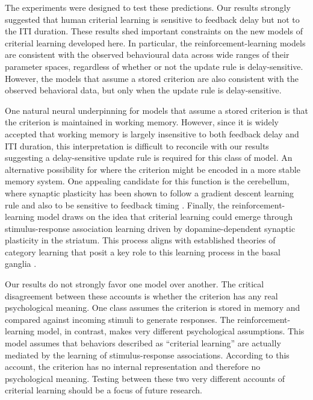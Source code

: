 \documentclass[doc, floatsintext]{apa7}
\begin{document}
The experiments were designed to test these predictions. Our
results strongly suggested that human criterial learning is
sensitive to feedback delay but not to the ITI duration.
These results shed important constraints on the new models
of criterial learning developed here. In particular, the
reinforcement-learning models are consistent with the
observed behavioural data across wide ranges of their
parameter spaces, regardless of whether or not the update
rule is delay-sensitive.  However, the models that assume a
stored criterion are also consistent with the observed
behavioral data, but only when the update rule is
delay-sensitive.

One natural neural underpinning for models that assume a
stored criterion is that the criterion is maintained in
working memory. However, since it is widely accepted that
working memory is largely insensitive to both feedback delay
and ITI duration, this interpretation is difficult to
reconcile with our results suggesting a delay-sensitive
update rule is required for this class of model. An
alternative possibility for where the criterion might be
encoded in a more stable memory system.  One appealing
candidate for this function is the cerebellum, where
synaptic plasticity has been shown to follow a gradient
descent learning rule and also to be sensitive to feedback
timing \parencite{brudner2016delayed, held_adaptation_1966,
honda_adaptation_2012, kitazawa_effects_1995,
kitazawa_prism_2002}.   Finally, the reinforcement-learning
model draws on the idea that criterial learning could emerge
through stimulus-response association learning driven by
dopamine-dependent synaptic plasticity in the striatum. This
process aligns with established theories of category
learning that posit a key role to this learning process in
the basal ganglia \cite{AshbyCOVIS1998}.

Our results do not strongly favor one model over another.
The critical disagreement between these accounts is whether
the criterion has any real psychological meaning. One class
assumes the criterion is stored in memory and compared
against incoming stimuli to generate responses.  The
reinforcement-learning model, in contrast, makes very
different psychological assumptions. This model assumes that
behaviors described as ``criterial learning'' are actually
mediated by the learning of stimulus-response associations.
According to this account, the criterion has no internal
representation and therefore no psychological meaning.
Testing between these two very different accounts of
criterial learning should be a focus of future research. 
\end{document}
